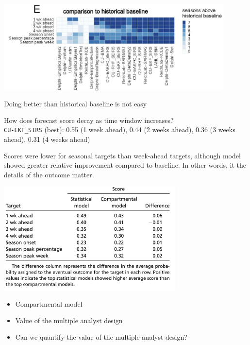 \documentclass[aspectratio=169]{beamer}
\begin{document}
\begin{frame}

\begin{center}
\includegraphics[width = 0.9\textwidth]{figures/reich_collaborative_2019_fig3e}
\end{center}

Doing better than historical baseline is not easy

\end{frame}
\begin{frame}

How does forecast score decay as time window increases? \pause \\
\texttt{CU-EKF\_SIRS} (best): 0.55 (1 week ahead), 0.44 (2 weeks ahead), 0.36 (3 weeks ahead), 0.31 (4 weeks ahead)

\end{frame}
\begin{frame}

Scores were lower for seasonal targets than week-ahead targets, although model showed greater relative improvement compared to baseline.  In other words, it the details of the outcome matter.

\end{frame}
\begin{frame}

\begin{center}
\includegraphics[width = 0.7\textwidth]{figures/reich_collaborative_2019_tab2}
\end{center}

\vfill
\begin{itemize}
\item Compartmental model
\pause 
\item Value of the multiple analyst design
\pause
\item Can we quantify the value of the multiple analyst design?
\end{itemize}

\end{frame}
\end{document}
